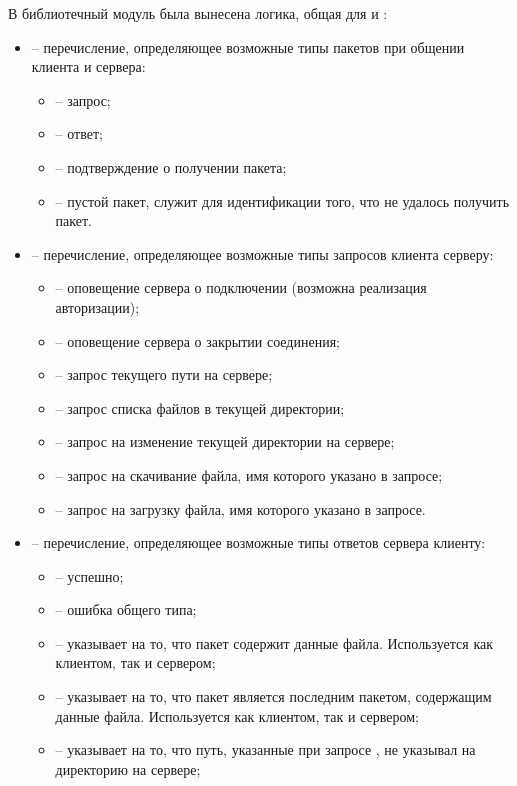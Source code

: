 В библиотечный модуль  была вынесена логика, общая для  и :
\begin{itemize}
	\item {} -- перечисление, определяющее возможные типы пакетов при общении клиента и сервера:
		\begin{itemize}
			\item {} -- запрос;
			\item {} -- ответ;
			\item {} -- подтверждение о получении пакета;
			\item {} -- пустой пакет, служит для идентификации того, что не удалось получить пакет.
		\end{itemize}
	\item {} -- перечисление, определяющее возможные типы запросов клиента серверу:
		\begin{itemize}
			\item {} -- оповещение сервера о подключении (возможна реализация авторизации);
			\item {} -- оповещение сервера о закрытии соединения;
			\item {} -- запрос текущего пути на сервере;
			\item {} -- запрос списка файлов в текущей директории;
			\item {} -- запрос на изменение текущей директории на сервере;
			\item {} -- запрос на скачивание файла, имя которого указано в запросе;
			\item {} -- запрос на загрузку файла, имя которого указано в запросе.
		\end{itemize}
	\item {} -- перечисление, определяющее возможные типы ответов сервера клиенту:
		\begin{itemize}
			\item {} -- успешно;
			\item {} -- ошибка общего типа;
			\item {} -- указывает на то, что пакет содержит данные файла. Используется как клиентом, так и сервером;
			\item {} -- указывает на то, что пакет является последним пакетом, содержащим данные файла. Используется как клиентом, так и сервером;
			\item {} -- указывает на то, что путь, указанные при запросе , не указывал на директорию на сервере;

\end{itemize}
\end{itemize}
